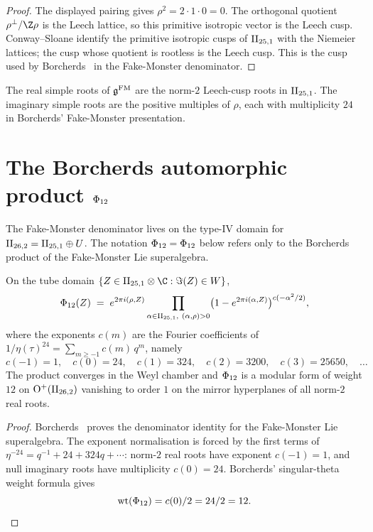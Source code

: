 \begin{proof}
The displayed pairing gives $\rho^2=2\cdot1\cdot0=0$. The orthogonal
quotient $\rho^\perp/\Z\rho$ is the Leech lattice, so this primitive
isotropic vector is the Leech cusp. Conway--Sloane identify the primitive
isotropic cusps of $\mathrm{II}_{25,1}$ with the Niemeier lattices; the cusp whose
quotient is rootless is the Leech cusp. This is the cusp used by
Borcherds~\cite{Borcherds1990Adv} in the Fake-Monster denominator.
\end{proof}

The real simple roots of $\mathfrak{g}^{\mathrm{FM}}$ are the norm-$2$ Leech-cusp roots in
$\mathrm{II}_{25,1}$. The imaginary simple roots are the positive multiples of
$\rho$, each with multiplicity $24$ in Borcherds' Fake-Monster
presentation.

\section{The Borcherds automorphic product \texorpdfstring{$\Phi_{12}$}{PhiFM}}
\label{sec:fm-phi12}

The Fake-Monster denominator lives on the type-IV domain for
$\mathrm{II}_{26,2}=\mathrm{II}_{25,1}\oplus U$. The notation $\Phi_{12}=\Phi_{12}$ below refers
only to the Borcherds product of the Fake-Monster Lie superalgebra.

\begin{theorem}
\label{thm:fm-denominator}
On the tube domain $\{Z\in\IIlor\otimes\C : \Im(Z)\in W\}$,
\[
 \Phi_{12}(Z) \;=\; e^{2\pi i(\rho, Z)} \prod_{\alpha\in\mathrm{II}_{25,1},\ (\alpha,\rho)>0} \bigl(1 - e^{2\pi i(\alpha, Z)}\bigr)^{c(-\alpha^2/2)},
\]
where the exponents $c(m)$ are the Fourier coefficients of $1/\eta(\tau)^{24} = \sum_{m\geq -1} c(m)\, q^m$, namely
\[
 c(-1) = 1,\quad c(0) = 24,\quad c(1) = 324,\quad c(2) = 3200,\quad c(3) = 25650,\quad \ldots
\]
The product converges in the Weyl chamber and $\Phi_{12}$ is a modular form of weight $12$ on $\mathrm{O}^{+}(\mathrm{II}_{26,2})$ vanishing to order $1$ on the mirror hyperplanes of all norm-$2$ real roots.
\end{theorem}

\begin{proof}
Borcherds~\cite{Borcherds1990Adv} proves the denominator identity for
the Fake-Monster Lie superalgebra. The exponent normalisation is forced
by the first terms of $\eta^{-24}=q^{-1}+24+324q+\cdots$: norm-$2$ real
roots have exponent $c(-1)=1$, and null imaginary roots have multiplicity
$c(0)=24$. Borcherds' singular-theta weight formula
\cite[Theorem~13.3]{Borcherds1998} gives
\[
 \mathrm{wt}(\Phi_{12})=c(0)/2=24/2=12.
\]
\end{proof}


